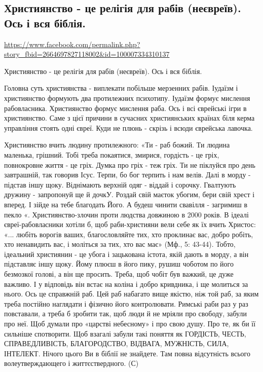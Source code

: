  
 
 
 
 

\subsection{Християнство - це релігія для рабів (неєвреїв). Ось і вся біблія.}
\url{https://www.facebook.com/permalink.php?story_fbid=2664697827118002&id=100007334310137}

Християнство - це релігія для рабів (неєвреїв). Ось і вся біблія.

Головна суть християнства - виплекати побільше мерзенних рабів. Іудаїзм і
християнство формують два протилежних психотипу. Іудаїзм формує мислення
рабовласника. Християнство формує мислення раба. Ось і всі єврейські  ігри в
християнство. Саме з цієї причини в сучасних християнських країнах біля керма
управління стоять одні євреї. Куди не плюнь - скрізь і всюди єврейська лавочка.

Християнство вчить людину протилежного: «Ти - раб божий. Ти людина маленька,
грішний. Тобі треба покаятися, змирися, гордість - це гріх,  повнокровне життя
- це гріх. Думка про гріх - теж гріх. Ти не піклуйся про день завтрашній, так
говорив Ісус. Терпи, бо бог терпить і нам велів. Далі в морду - підстав іншу
щоку. Віднімають верхній одяг - віддай і сорочку. Гвалтують дружину -
запропонуй ще й дочкУ. Роздай свій маєток убогим, бери свій хрест і вперед. І
зійде на тебе благодать Його. А будеш чинити свавілля - загримиш в пекло «.
Християнство-злочин проти людства довжиною в 2000 років.  В ідеалі
євреї-рабовласники хотіли б, щоб раби-християни вели себе як їх вчить Христос:
«... любіть ворогів ваших, благословляйте тих, хто проклинає вас, добро робіть,
хто ненавидить вас, і моліться за тих, хто вас має» (Мф., 5: 43-44). Тобто,
ідеальний християнин - це убога і зацькована  істота, якій дають в морду, а він
підставляє іншу щоку. Йому плюєш в його пику, рушиш чоботом по його безмозкої
голові, а він ще просить. Треба, щоб чобіт був важкий, це дуже важливо. І у
відповідь він встає на коліна і добро кривдника, і ще молиться за нього. Ось це
справжній раб. Цей раб набагато вище якістю, ніж той раб, за яким треба
постійно наглядати і фізично його контролювати. Римські раби раз у раз
повставали, а треба б зробити так, щоб люди й не мріяли про свободу, забули про
неї. Щоб думали про «царстві небесному» і про свою душу. Про те, як би її
сильніше спотворити. Щоб взагалі забули такі поняття як ГОРДІСТЬ, ЧЕСТЬ,
СПРАВЕДЛИВІСТЬ, БЛАГОРОДСТВО, ВІДВАГА, МУЖНІСТЬ, СИЛА, ІНТЕЛЕКТ. Нічого цього
Ви в біблії не знайдете. Там повна відсутність всього волеутверждающего і
життєствердного.
(С)
